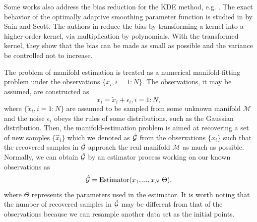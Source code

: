 \documentclass[aos,preprint]{imsart}
\theoremstyle{remark}
\begin{document}
Some works also address the bias reduction for the KDE method, e.g. \cite{ImprovingBias2014,sain1996locally}. The exact behavior of the optimally adaptive smoothing parameter function is studied in \cite{sain1996locally} by Sain and Scott. The authors in \cite{ImprovingBias2014} reduce the bias by transforming a kernel into a higher-order kernel, via multiplication by polynomials. With the transformed kernel, they show that the bias can be made as small as possible and the variance be controlled not to increase.

The problem of manifold estimation is treated as a numerical manifold-fitting problem under the observations $\{x_i, i=1:N\}$. The observations, it may be assumed, are constructed as 
\[
x_i=\tilde{x}_i+\epsilon_i, i=1:N,
\] 
where $\{\tilde{x}_i, i= 1:N\}$ are assumed to be sampled from some unknown manifold $\mathcal M$ and the noise $\epsilon_i$ obeys the rules of some distributions, such as the Gaussian distribution.  %
Then, the manifold-estimation problem is aimed at recovering a set of new samples $\{\hat{x}_i\}$ which we denoted as $\hat{\cal G}$ from the observations $\{x_i\}$ such that the recovered samples in $\hat{\cal G}$ approach the real manifold $\mathcal M$ as much as possible. Normally, we can obtain $\hat{\cal G}$ by an estimator process working on our known observations as
\begin{equation}\label{Estimator}
\hat{\cal G} = {\rm Estimator}(x_1,...,x_N | \Theta),
\end{equation}
where $\Theta$ represents the parameters used in the estimator. It is worth noting that the number of recovered samples in $\hat{\cal G}$ may be different from that of the observations because we can resample another data set as the initial points.
\end{document}
